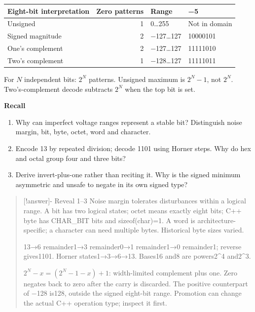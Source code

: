 {\def\LTcaptype{none} %
\begin{longtable}[]{@{}lrll@{}}
\toprule\noalign{}
Eight-bit interpretation & Zero patterns & Range & −5 \\
\midrule\noalign{}
\endhead
\bottomrule\noalign{}
\endlastfoot
Unsigned & 1 & 0\ldots255 & Not in domain \\
Signed magnitude & 2 & −127\ldots127 & 10000101 \\
One's complement & 2 & −127\ldots127 & 11111010 \\
Two's complement & 1 & −128\ldots127 & 11111011 \\
\end{longtable}
}

For \(N\) independent bits: \(2^N\) patterns. Unsigned maximum is \(2^N-1\), not \(2^N\). Two's-complement decode subtracts \(2^N\) when the top bit is set.

\textbf{Recall}

\begin{enumerate}
\def\labelenumi{\arabic{enumi}.}
\tightlist
\item
  Why can imperfect voltage ranges represent a stable bit? Distinguish noise margin, bit, byte, octet, word and character.
\item
  Encode 13 by repeated division; decode 1101 using Horner steps. Why do hex and octal group four and three bits?
\item
  Derive invert-plus-one rather than reciting it. Why is the signed minimum asymmetric and unsafe to negate in its own signed type?
\end{enumerate}

\begin{quote}
{[}!answer{]}- Reveal 1--3 Noise margin tolerates disturbances within a logical range. A bit has two logical states; octet means exactly eight bits; C++ byte has CHAR\_BIT bits and sizeof(char)=1. A word is architecture-specific; a character can need multiple bytes. Historical byte sizes varied.

13→6 remainder1→3 remainder0→1 remainder1→0 remainder1; reverse gives1101. Horner states1→3→6→13. Bases16 and8 are powers2\^{}4 and2\^{}3.

\(2^N-x=(2^N-1-x)+1\): width-limited complement plus one. Zero negates back to zero after the carry is discarded. The positive counterpart of −128 is128, outside the signed eight-bit range. Promotion can change the actual C++ operation type; inspect it first.
\end{quote}

